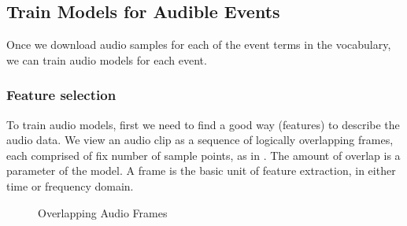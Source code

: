 \subsection{Train Models for Audible Events} 
\label{sec:audiotrain}

Once we download audio samples for each of the event terms in the vocabulary,
we can train audio models for each event. 

\subsubsection{Feature selection}
To train audio models, first we need to find a good way (features) 
to describe the audio data. 
We view an audio clip as a sequence of logically overlapping frames, 
each comprised of fix number of sample points, as in .
The amount of overlap is a parameter of the model.
A frame is the basic unit of feature extraction, 
in either time or frequency domain. 

\begin{figure}[th]
\centering
{}
\caption{Overlapping Audio Frames}
\label{fig:fra}
\end{figure}

%
%
%
%

